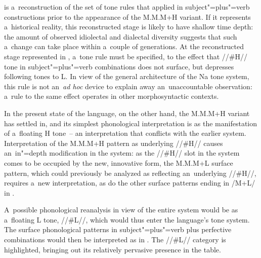  is a~reconstruction of the set of tone rules that applied in
subject"=plus"=verb constructions prior to the appearance of the M.M.M+H variant. If it represents a~historical reality, this reconstructed stage is likely to have shallow time depth: the amount of observed idiolectal and dialectal diversity suggests that such a~change can take place within a~couple of generations. At the reconstructed stage represented in , a~tone rule must be specified, to the effect that \mbox{//\#H//} tone in subject"=plus"=verb combinations does not
surface, but depresses following tones to L. In view of the general architecture of the Na tone
system, this rule is not an~\textit{ad hoc} device to explain away an~unaccountable observation:
a~rule to the same effect operates in other morphosyntactic contexts.

In the present state of the language, on the other hand, the M.M.M+H variant has settled in, and its simplest phonological interpretation is as the
manifestation of a~floating H tone~-- an interpretation that conflicts with the earlier system. Interpretation of the M.M.M+H pattern as underlying \mbox{//\#H//} causes an~in"=depth modification in the
system: as the \mbox{//\#H//} slot in the system comes to be occupied by the new, innovative form,
the M.M.M+L surface pattern, which could previously be analyzed as reflecting an~underlying \mbox{//\#H//},
requires a~new interpretation, as do the other surface patterns ending in /M+L/ in . 

A~possible phonological reanalysis in view of the entire system would be as a~floating L tone, //\#L//, which would thus enter the language’s tone system. The surface phonological
patterns in subject"=plus"=verb plus {perfective} combinations would then be interpreted as in . The //\#L//
category is highlighted, bringing out its relatively pervasive presence in the table.

